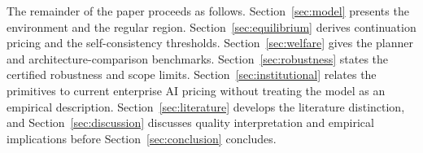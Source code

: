 The remainder of the paper proceeds as follows. Section~\ref{sec:model} presents the environment and the regular region. Section~\ref{sec:equilibrium} derives continuation pricing and the self-consistency thresholds. Section~\ref{sec:welfare} gives the planner and architecture-comparison benchmarks. Section~\ref{sec:robustness} states the certified robustness and scope limits. Section~\ref{sec:institutional} relates the primitives to current enterprise AI pricing without treating the model as an empirical description. Section~\ref{sec:literature} develops the literature distinction, and Section~\ref{sec:discussion} discusses quality interpretation and empirical implications before Section~\ref{sec:conclusion} concludes.

